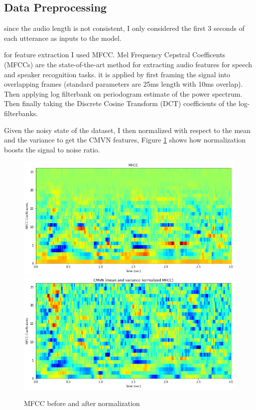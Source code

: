 \documentclass{article}
\begin{document}
\subsection{Data Preprocessing}
since the audio length is not consistent, I only considered the first 3 seconds of each utterance as inputs to the model. 

for feature extraction I used MFCC. Mel Frequency Cepstral Coefficents (MFCCs) are the state-of-the-art method for extracting audio features for speech and speaker recognition tasks. it is applied by first framing the signal into overlapping frames (standard parameters are 25ms length with 10ms overlap). Then applying log filterbank on periodogram estimate of the power spectrum. Then finally taking the Discrete Cosine Transform (DCT) coefficients of the log-filterbanks.\cite{jlyon}

Given the noisy state of the dataset, I then normalized with respect to the mean and the variance to get the CMVN features, Figure \ref{fig:normalizatin} shows how normalization boosts the signal to noise ratio.

\begin{figure}[H]
    \includegraphics[scale=.5]{images/mfcc.png}
    \includegraphics[scale=.5]{images/cmvn.png}
    \caption{MFCC before and after normalization}
    \label{fig:normalizatin}
\end{figure}
\end{document}
